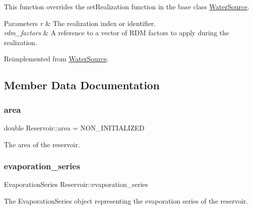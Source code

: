 This function overrides the {\ttfamily set\+Realization} function in the base class {\ttfamily \mbox{\hyperlink{classWaterSource}{Water\+Source}}}.


\begin{DoxyParams}{Parameters}
{\em r} & The realization index or identifier. \\
\hline
{\em rdm\+\_\+factors} & A reference to a vector of R\+DM factors to apply during the realization. \\
\hline
\end{DoxyParams}


Reimplemented from \mbox{\hyperlink{classWaterSource_a634904c510b16de6d7c057fed6d6e625}{Water\+Source}}.



\subsection{Member Data Documentation}
\mbox{\label{classReservoir_a57ab55e0dde9e29a4ff97de98b09e458}} 
\subsubsection{\texorpdfstring{area}{area}}
{\footnotesize\ttfamily double Reservoir\+::area = N\+O\+N\+\_\+\+I\+N\+I\+T\+I\+A\+L\+I\+Z\+ED\hspace{0.3cm}{\ttfamily [protected]}}



The area of the reservoir. 

\mbox{\label{classReservoir_a2d2d9b302c13703309bb798d24136810}} 
\subsubsection{\texorpdfstring{evaporation\+\_\+series}{evaporation\_series}}
{\footnotesize\ttfamily Evaporation\+Series Reservoir\+::evaporation\+\_\+series}



The Evaporation\+Series object representing the evaporation series of the reservoir. 

\mbox{\label{classReservoir_ad4b37aef4873071d1766baaccce5b8cf}} 
